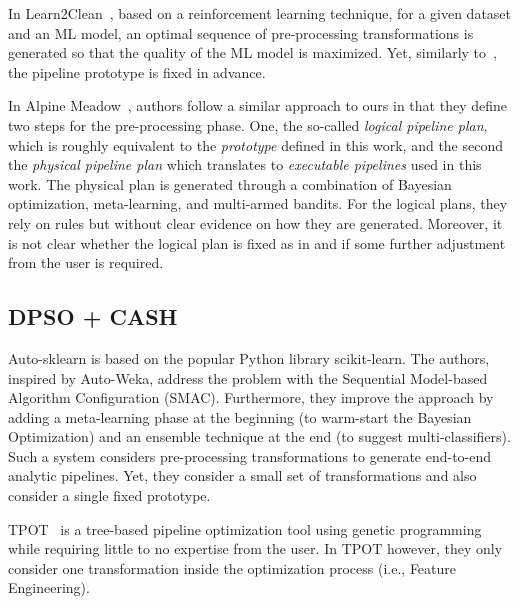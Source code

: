In Learn2Clean~\cite{Berti19WWW}, based on a reinforcement learning technique, for a given dataset and an ML model, an optimal sequence of pre-processing transformations is generated so that the quality of the ML model is maximized.
Yet, similarly to~\cite{Quemy20InfSystems}, the pipeline prototype is fixed in advance.

In Alpine Meadow~\cite{Shang19SIGMOD}, authors follow a similar approach to ours in that they define two steps for the pre-processing phase. One, the so-called \textit{logical pipeline plan}, which is roughly equivalent to the \textit{prototype} defined in this work, and the second the \textit{physical pipeline plan} which translates to \textit{executable pipelines} used in this work.
The physical plan is generated through a combination of Bayesian optimization, meta-learning, and multi-armed bandits.
For the logical plans, they rely on rules but without clear evidence on how they are generated.
Moreover, it is not clear whether the logical plan is fixed as in \cite{Quemy20InfSystems} and if some further adjustment from the user is required.

\subsection{DPSO + CASH}
\label{effective-ssec:dpso-cash}
Auto-sklearn \cite{Feurer15AutoSklearn} is based on the popular Python library scikit-learn.
The authors, inspired by Auto-Weka, address the problem with the Sequential Model-based Algorithm Configuration (SMAC).
Furthermore, they improve the approach by adding a meta-learning phase at the beginning (to warm-start the Bayesian Optimization) and an ensemble technique at the end (to suggest multi-classifiers).
Such a system considers pre-processing transformations to generate end-to-end analytic pipelines.
Yet, they consider a small set of transformations and also consider a single fixed prototype.

TPOT~\cite{Olson16Tpot} is a tree-based pipeline optimization tool using genetic programming while requiring little to no expertise from the user.
In TPOT however, they only consider one transformation inside the optimization process (i.e., Feature Engineering).

